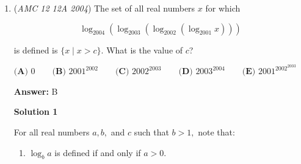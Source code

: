 \begin{enumerate}
 $\text {(A) }250 \qquad \text {(B) }300 \qquad \text {(C) }350 \qquad \text {(D) } 400\qquad \text {(E) }500$

 \textbf{Answer: }C



\textbf{Solution 1}

Call the length of the race track $x$. When they meet at the first meeting point, Brenda has run $100$ meters, while Sally has run $\frac{x}{2} - 100$ meters. By the second meeting point, Sally has run $150$ meters, while Brenda has run $x - 150$ meters. Since they run at a constant speed, we can set up a \href{https://artofproblemsolving.com/wiki/index.php?title=Proportion}{proportion}: $\frac{100}{x- 150} = \frac{\frac{x}{2} - 100}{150}$. Cross-multiplying, we get that $x = 350\Longrightarrow\boxed{\mathrm{(C)}\ 350}$.

 



\textbf{Solution 2}

The total distance the girls run between the start and the first meeting is one half of the track length. The total distance they run between the two meetings is the track length. As the girls run at constant speeds, the interval between the meetings is twice as long as the interval between the start and the first meeting. Thus between the meetings Brenda will run $2\times100=200$ meters. Therefore the length of the track is $150 + 200 = 350$ meters $\Rightarrow\boxed{\mathrm{(C)}\ 350}$

 Education, the Study of Everything

 


	\item (\textit{AMC 12 12A 2004}) The set of all real numbers $x$ for which


 
 \[\log_{2004}(\log_{2003}(\log_{2002}(\log_{2001}{x})))\]


 is defined is $\{x\mid x > c\}$. What is the value of $c$?


 $\textbf {(A) } 0\qquad \textbf {(B) }2001^{2002} \qquad \textbf {(C) }2002^{2003} \qquad \textbf {(D) }2003^{2004} \qquad \textbf {(E) }2001^{2002^{2003}}$

 \textbf{Answer: }B



\textbf{Solution 1}

For all real numbers $a,b,$ and $c$ such that $b>1,$ note that:

 
            \begin{enumerate} 
        \item $\log_b a$ is defined if and only if $a>0.$


\end{enumerate}
\end{enumerate}
